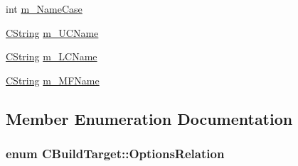 \begin{DoxyCompactItemize}
\item 
int \hyperlink{classCBuildTarget_a046e2fd1be16b46b33bde0edc0f275c4}{m\-\_\-\-Name\-Case}
\item 
\hyperlink{classCString}{C\-String} \hyperlink{classCBuildTarget_ab3da058a427da4e7a16f138d35150b62}{m\-\_\-\-U\-C\-Name}
\item 
\hyperlink{classCString}{C\-String} \hyperlink{classCBuildTarget_a1cc23d76e72157889515dfbf6d682ef5}{m\-\_\-\-L\-C\-Name}
\item 
\hyperlink{classCString}{C\-String} \hyperlink{classCBuildTarget_a8594a1a74d27e7deec778e5b968497ad}{m\-\_\-\-M\-F\-Name}
\end{DoxyCompactItemize}


\subsection{Member Enumeration Documentation}
\hypertarget{classCBuildTarget_a65a8d160e9cb9cc5632373836e0adb9e}{
\subsubsection[{Options\-Relation}]{\setlength{\rightskip}{0pt plus 5cm}enum {\bf C\-Build\-Target\-::\-Options\-Relation}}}\label{classCBuildTarget_a65a8d160e9cb9cc5632373836e0adb9e}
